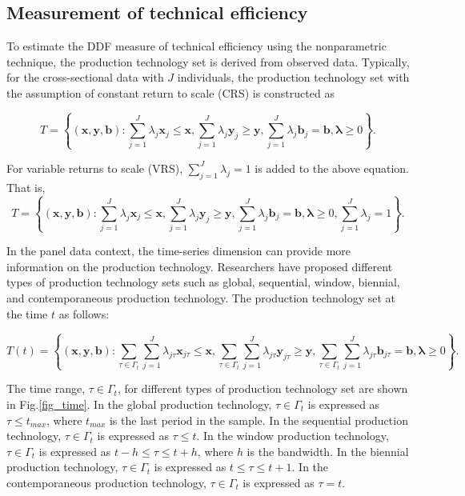 \subsection{Measurement of technical efficiency}
To estimate the DDF measure of technical efficiency using the nonparametric technique, the production technology set is derived from observed data. Typically, for the cross-sectional data with $J$ individuals, the production technology set with the assumption of constant return to scale (CRS) is constructed as

\begin{equation}\label{eq_tech_dea}
    T = \left\{ {({\pmb{x}},{\pmb{y}},{\pmb{b}}):\sum\limits_{j = 1}^J {{\lambda _j}{{\pmb{x}}_j} \le {\pmb{x}},\sum\limits_{j = 1}^J {{\lambda _j}{{\pmb{y}}_j} \ge {\pmb{y}},} \sum\limits_{j = 1}^J {{\lambda _j}{{\pmb{b}}_j} = {\pmb{b}},} }  {\pmb{\lambda }} \ge 0} \right\}.
\end{equation}

For variable returns to scale (VRS), $\sum_{j=1}^{J} \lambda_j =1$ is added to the above equation. That is,
\begin{equation}\label{eq_tech_dea_v}
    T = \left\{ {({\pmb{x}},{\pmb{y}},{\pmb{b}}):\sum\limits_{j = 1}^J {{\lambda _j}{{\pmb{x}}_j} \le {\pmb{x}},\sum\limits_{j = 1}^J {{\lambda _j}{{\pmb{y}}_j} \ge {\pmb{y}},} \sum\limits_{j = 1}^J {{\lambda _j}{{\pmb{b}}_j} = {\pmb{b}},} }  {\pmb{\lambda }} \ge 0}, \sum\limits_{j = 1}^J {{\lambda _j} = 1} \right\}.
\end{equation}

In the panel data context, the time-series dimension can provide more information on the production technology. Researchers have proposed different types of production technology sets such as global, sequential, window, biennial, and contemporaneous production technology. The production technology set at the time $t$ as follows:

\begin{equation}\label{eq_tech_dea_panel}
	T(t) = \left\{ {({\pmb{x}},{\pmb{y}},{\pmb{b}}):\sum\limits_{\tau \in \Gamma_t }\sum\limits_{j = 1}^J {{\lambda _{j\tau}}{{\pmb{x}}_{j\tau}} \le {\pmb{x}},\sum\limits_{\tau \in \Gamma_t }\sum\limits_{j = 1}^J {{\lambda _{j\tau}}{{\pmb{y}}_{j\tau}} \ge {\pmb{y}},} \sum\limits_{\tau \in \Gamma_t }\sum\limits_{j = 1}^J {{\lambda _{j\tau}}{{\pmb{b}}_{j\tau}} = {\pmb{b}},} } {\pmb{\lambda }} \ge 0} \right\}.
\end{equation}


The time range, $\tau \in \Gamma_t$, for different types of production technology set are shown in Fig.\ref{fig_time}. In the global production technology, $\tau \in \Gamma_t$ is expressed as $\tau \leq t_{max}$, where $t_{max}$ is the last period in the sample. In the sequential production technology, $\tau \in \Gamma_t$ is expressed as $\tau \leq t$. In the window production technology, $\tau \in \Gamma_t$ is expressed as $t - h \leq \tau \leq t + h $, where $h$ is the bandwidth.  In the biennial production technology, $\tau \in \Gamma_t$ is expressed as $t \leq \tau \leq t + 1 $. In the contemporaneous production technology, $\tau \in \Gamma_t$ is expressed as $\tau=t$. 

